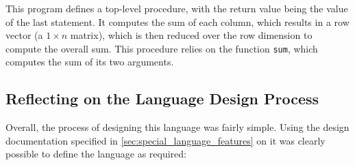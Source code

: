 This program defines a top-level procedure, with the return value being the value of the last statement. 
It computes the sum of each column, which results in a row vector (a $1 \times n$ matrix), which is then reduced over the row dimension to compute the overall sum.
This procedure relies on the function \texttt{sum}, which computes the sum of its two arguments. 


\subsection{Reflecting on the Language Design Process} %
\label{sub:reflecting_on_the_language_design_process}
Overall, the process of designing this language was fairly simple.
Using the design documentation specified in \autoref{sec:special_language_features} on  it was clearly possible to define the language as required:
